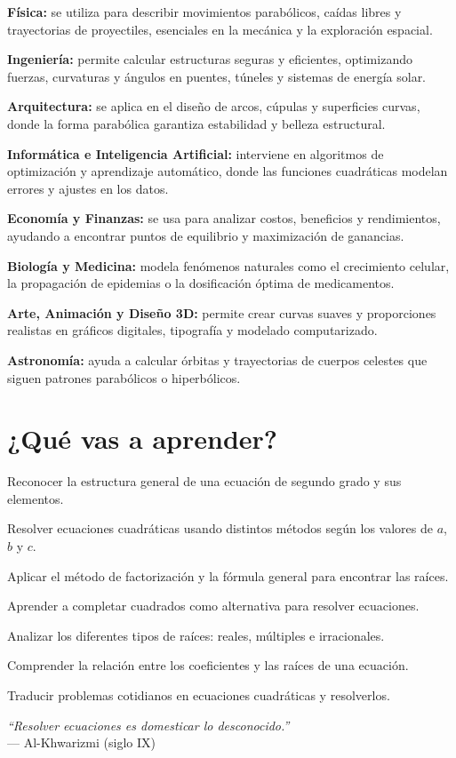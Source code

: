 \begin{importancialist}
    \item \textbf{Física:} se utiliza para describir movimientos parabólicos, caídas libres y trayectorias de proyectiles, esenciales en la mecánica y la exploración espacial.  
    \item \textbf{Ingeniería:} permite calcular estructuras seguras y eficientes, optimizando fuerzas, curvaturas y ángulos en puentes, túneles y sistemas de energía solar.  
    \item \textbf{Arquitectura:} se aplica en el diseño de arcos, cúpulas y superficies curvas, donde la forma parabólica garantiza estabilidad y belleza estructural.  
    \item \textbf{Informática e Inteligencia Artificial:} interviene en algoritmos de optimización y aprendizaje automático, donde las funciones cuadráticas modelan errores y ajustes en los datos.  
    \item \textbf{Economía y Finanzas:} se usa para analizar costos, beneficios y rendimientos, ayudando a encontrar puntos de equilibrio y maximización de ganancias.  
    \item \textbf{Biología y Medicina:} modela fenómenos naturales como el crecimiento celular, la propagación de epidemias o la dosificación óptima de medicamentos.  
    \item \textbf{Arte, Animación y Diseño 3D:} permite crear curvas suaves y proporciones realistas en gráficos digitales, tipografía y modelado computarizado.  
    \item \textbf{Astronomía:} ayuda a calcular órbitas y trayectorias de cuerpos celestes que siguen patrones parabólicos o hiperbólicos.  
\end{importancialist}

\section*{¿Qué vas a aprender?}
\begin{aprende}
  \item Reconocer la estructura general de una ecuación de segundo grado y sus elementos.  
  \item Resolver ecuaciones cuadráticas usando distintos métodos según los valores de $a$, $b$ y $c$.  
  \item Aplicar el método de factorización y la fórmula general para encontrar las raíces.  
  \item Aprender a completar cuadrados como alternativa para resolver ecuaciones.  
  \item Analizar los diferentes tipos de raíces: reales, múltiples e irracionales.  
  \item Comprender la relación entre los coeficientes y las raíces de una ecuación.  
  \item Traducir problemas cotidianos en ecuaciones cuadráticas y resolverlos.  
\end{aprende}

\vspace{1cm}
\begin{flushright}
  {\oneptup\itshape ``Resolver ecuaciones es domesticar lo desconocido.''}\\
  {\oneptup — Al-Khwarizmi (siglo IX)}
\end{flushright}


